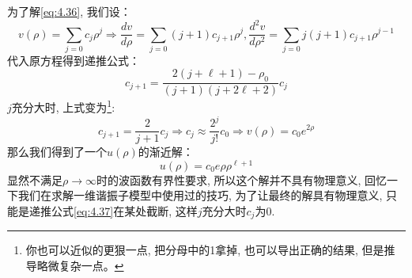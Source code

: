 \documentclass[a4paper,zihao=-4,linespread=1]{ctexrep}
\begin{document}
    为了解\ref{eq:4.36}, 我们设：
    \[v(\rho)=\sum\limits_{j=0}c_j\rho^j\Rightarrow\frac{dv}{d\rho}=\sum\limits_{j=0}\left(j+1\right)c_{j+1}\rho^j,\frac{d^2v}{d\rho^2}=\sum\limits_{j=0}j\left(j+1\right)c_{j+1}\rho^{j-1}\]
    代入原方程得到递推公式：
    \begin{equation}
        \label{eq:4.37}
        c_{j+1}=\frac{2\left(j+\ell+1\right)-\rho_0}{\left(j+1\right)\left(j+2\ell+2\right)}c_j
    \end{equation}
    $j$充分大时, 上式变为\footnote{你也可以近似的更狠一点, 把分母中的1拿掉, 也可以导出正确的结果, 但是推导略微复杂一点。}:
    \[c_{j+1}=\frac{2}{j+1}c_j\Rightarrow c_j\approx\frac{2^j}{j!}c_0\Rightarrow v(\rho)=c_0e^{2\rho}\]
    那么我们得到了一个$u(\rho)$的渐近解：
    \[u(\rho)=c_0e\rho\rho^{\ell+1}\]
    显然不满足$\rho\to\infty$时的波函数有界性要求, 所以这个解并不具有物理意义, 回忆一下我们在求解一维谐振子模型中使用过的技巧, 为了让最终的解具有物理意义,
    只能是递推公式\ref{eq:4.37}在某处截断, 这样$j$充分大时$c_j$为$0$.
\end{document}
